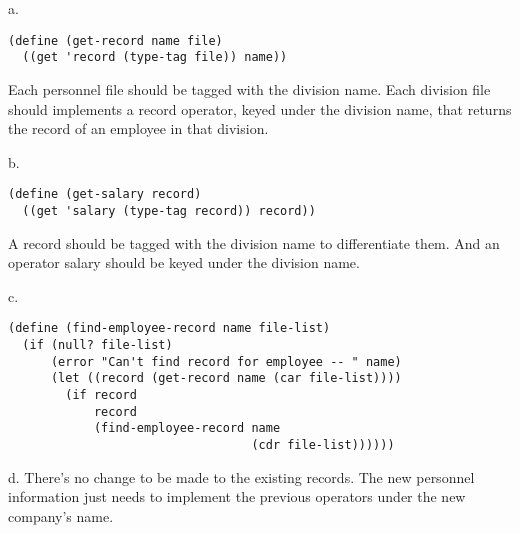 \documentclass[a4paper,12pt]{article}
\newcommand{\subpar}[1] {\medskip \noindent #1.} \lstset{language=Lisp}
\begin{document}
\subpar{a}
\begin{lstlisting}
(define (get-record name file)
  ((get 'record (type-tag file)) name))
\end{lstlisting}
Each personnel file should be tagged with the division name.  Each
division file should implements a record operator, keyed under the
division name, that returns the record of an employee in that
division.

\subpar{b}
\begin{lstlisting}
(define (get-salary record)
  ((get 'salary (type-tag record)) record))
\end{lstlisting}
A record should be tagged with the division name to differentiate
them.  And an operator salary should be keyed under the division name.

\subpar{c}
\begin{lstlisting}
(define (find-employee-record name file-list)
  (if (null? file-list)
      (error "Can't find record for employee -- " name)
      (let ((record (get-record name (car file-list))))
        (if record
            record
            (find-employee-record name
                                  (cdr file-list))))))
\end{lstlisting}

\subpar{d}  There's no change to be made to the existing records.  The
new personnel information just needs to implement the previous
operators under the new company's name.
\end{document}
